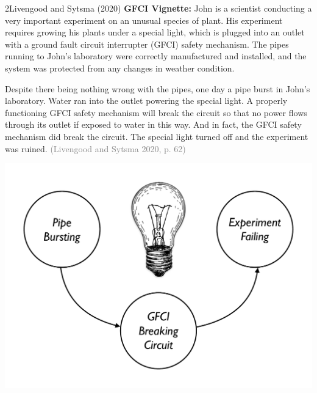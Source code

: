 \documentclass[xcolor=table,9pt,aspectratio=169]{beamer}
\begin{document}
\begin{frame}{\vspace*{10mm}2\hspace*{1em}Livengood and Sytsma (2020)}
\vspace*{-5mm}
\textbf{GFCI Vignette:} John is a scientist conducting a very important experiment on an unusual species of plant. His experiment requires growing his plants under a special light, which is plugged into an outlet with a ground fault circuit interrupter (GFCI) safety mechanism. The pipes running to John's laboratory were correctly manufactured and installed, and the system was protected from any changes in weather condition.\par
\hspace{2em}Despite there being nothing wrong with the pipes, one day a pipe burst in John's laboratory. Water ran into the outlet powering the special light. A properly functioning GFCI safety mechanism will break the circuit so that no power flows through its outlet if exposed to water in this way. And in fact, the GFCI safety mechanism did break the circuit. The special light turned off and the experiment was ruined. \textcolor{gray}{(Livengood and Sytsma 2020, p. 62)}
\begin{center}
   \includegraphics[width=0.2\linewidth]{figures/gfci.pdf}
\end{center}
\end{frame}
\end{document}
